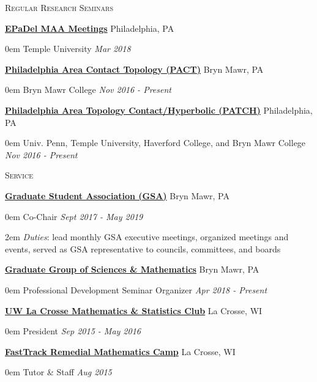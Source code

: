 \documentclass[11pt]{article}
\newenvironment{headitem}[2]{\hspace{.5em} \textbf{#1} \hfill #2 \begin{addmargin}[0em]{0em}}{\end{addmargin}}
\renewenvironment{section}[1]{\textsc{\large #1} \vskip5pt}{\vskip10pt}
\newcommand{\itemreg}[1]{\begin{addmargin}[.75em]{2em} #1 \end{addmargin}}
\newcommand{\itemdate}[2]{\hspace{.5em} #1 \hfill \textit{#2} \\}
\begin{document}
\begin{section}{Regular Research Seminars}
	
	\begin{headitem}{\href{http://sections.maa.org/epadel/}{EPaDel MAA Meetings}}{Philadelphia, PA}
		\itemdate{Temple University}{Mar 2018}
	\end{headitem}
	\vskip5pt
	
	\begin{headitem}{\href{https://www.brynmawr.edu/math/pact-seminar}{Philadelphia Area Contact Topology (PACT)}}{Bryn Mawr, PA}
		\itemdate{Bryn Mawr College}{Nov 2016 - Present}
	\end{headitem}
	\vskip5pt
	
	\begin{headitem}{\href{https://math.temple.edu/events/seminars/geometry/}{Philadelphia Area Topology Contact/Hyperbolic (PATCH)}}{Philadelphia, PA}
		\itemdate{Univ. Penn, Temple University, Haverford College, and Bryn Mawr College}{Nov 2016 - Present}
	\end{headitem}
	
\end{section}



\begin{section}{Service}

	\begin{headitem}{\href{https://www.brynmawr.edu/gsas/}{Graduate Student Association (GSA)}}{Bryn Mawr, PA}
		\itemdate{Co-Chair}{Sept 2017 - May 2019}
		\itemreg{\textit{Duties}: lead monthly GSA executive meetings, organized meetings and events, served as GSA representative to councils, committees, and boards}
	\end{headitem}
	\vskip5pt
	
	\begin{headitem}{\href{https://www.brynmawr.edu/ggsm}{Graduate Group of Sciences \& Mathematics}}{Bryn Mawr, PA}
		\itemdate{Professional Development Seminar Organizer}{Apr 2018 - Present}
	\end{headitem}
	\vskip5pt
	
	\begin{headitem}{\href{https://www.uwlax.edu/mathematics/activities/mathematics-and-stats-club/}{UW La Crosse Mathematics \& Statistics Club}}{La Crosse, WI}
		\itemdate{President}{Sep 2015 - May 2016}
	\end{headitem}
	\vskip5pt
	
	\begin{headitem}{\href{https://www.uwlax.edu/mathematics/fasttrack/}{FastTrack Remedial Mathematics Camp}}{La Crosse, WI}
		\itemdate{Tutor \& Staff}{Aug 2015}
	\end{headitem}
	
\end{section}
\end{document}
